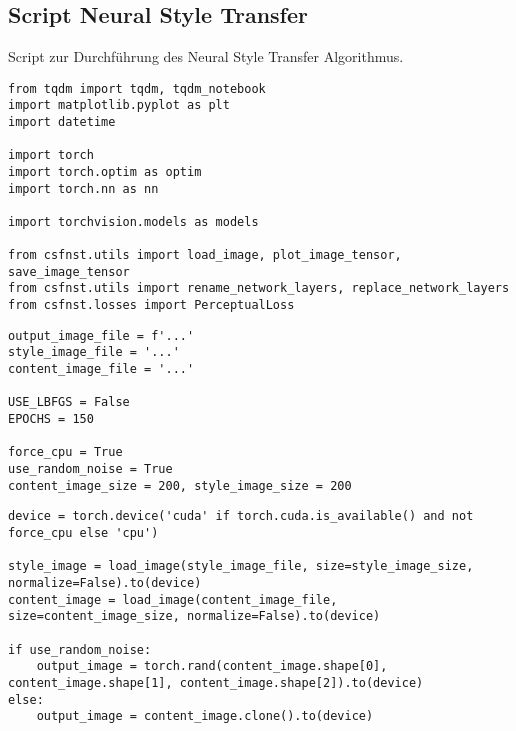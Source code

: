 \appendix
\chapter{}
\section{Script Neural Style Transfer}
\label{sec:script_neural_style_transfer}
Script zur Durchführung des Neural Style Transfer Algorithmus.

\begin{listing}[ht]
\begin{verbatim}
from tqdm import tqdm, tqdm_notebook
import matplotlib.pyplot as plt
import datetime

import torch
import torch.optim as optim
import torch.nn as nn

import torchvision.models as models

from csfnst.utils import load_image, plot_image_tensor, save_image_tensor
from csfnst.utils import rename_network_layers, replace_network_layers
from csfnst.losses import PerceptualLoss
\end{verbatim}
\label{lst:neural_style_transfer_1}
\end{listing}

\begin{listing}[ht]
\begin{verbatim}
output_image_file = f'...'
style_image_file = '...'
content_image_file = '...'

USE_LBFGS = False
EPOCHS = 150

force_cpu = True
use_random_noise = True
content_image_size = 200, style_image_size = 200
\end{verbatim}
\label{lst:neural_style_transfer_2}
\end{listing}

\begin{listing}[ht]
\begin{verbatim}
device = torch.device('cuda' if torch.cuda.is_available() and not force_cpu else 'cpu')

style_image = load_image(style_image_file, size=style_image_size, normalize=False).to(device)
content_image = load_image(content_image_file, size=content_image_size, normalize=False).to(device)

if use_random_noise:
    output_image = torch.rand(content_image.shape[0], content_image.shape[1], content_image.shape[2]).to(device)
else:
    output_image = content_image.clone().to(device)
\end{verbatim}
\label{lst:neural_style_transfer_3}
\end{listing}


